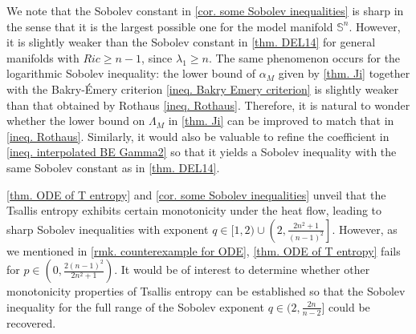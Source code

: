 \documentclass[11pt]{amsart}
\numberwithin{equation}{section}
\numberwithin{lemma}{section}
\numberwithin{proposition}{section}
\numberwithin{corollary}{section}
\numberwithin{remark}{section}
\begin{document}
We note that the Sobolev constant in \cref{cor. some Sobolev inequalities} is sharp in the sense that it is the largest possible one for the model manifold $\mathbb{S}^n$. However, it is slightly weaker than the Sobolev constant in \cref{thm. DEL14} for general manifolds with $Ric\geq n-1$, since $\lambda_1\geq n$. The same phenomenon occurs for the logarithmic Sobolev inequality: the lower bound of $\alpha_M$ given by \cref{thm. Ji} together with the Bakry-\'Emery criterion \cref{ineq. Bakry Emery criterion} is slightly weaker than that obtained by Rothaus \cref{ineq. Rothaus}. Therefore, it is natural to wonder whether the lower bound on $\Lambda _M$
in \cref{thm. Ji} can be improved to match that in \cref{ineq. Rothaus}. Similarly, it would also be valuable to refine the coefficient in \cref{ineq. interpolated BE Gamma2} so that it yields a Sobolev inequality with the same Sobolev constant as in \cref{thm. DEL14}.

\cref{thm. ODE of T entropy} and \cref{cor. some Sobolev inequalities} unveil that the Tsallis entropy exhibits certain monotonicity under the heat flow, leading to sharp Sobolev inequalities with exponent $q\in [1,2)\cup\left(2,\frac{2n^2+1}{(n-1)^2}\right]$. 
However, as we mentioned in \cref{rmk. counterexample for ODE}, \cref{thm. ODE of T entropy} fails for $p\in(0,\frac{2(n-1)^2}{2n^2+1})$.
It would be of interest to determine whether other monotonicity properties of Tsallis entropy can be established so that the Sobolev inequality for the full range of the Sobolev exponent $q\in (2,\frac{2n}{n-2}]$ could be recovered. 
\end{document}
